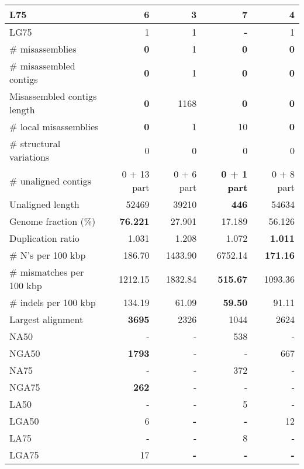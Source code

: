 \documentclass[12pt,a4paper]{article}
\begin{document}
\begin{table}[ht]
\begin{center}
\begin{tabular}{|l*{4}{|r}|}
L75 & 6 & {\bf 3} & 7 & 4 \\ \hline
LG75 & 1 & 1 & {\bf -} & 1 \\ \hline
\# misassemblies & {\bf 0} & 1 & {\bf 0} & {\bf 0} \\ \hline
\# misassembled contigs & {\bf 0} & 1 & {\bf 0} & {\bf 0} \\ \hline
Misassembled contigs length & {\bf 0} & 1168 & {\bf 0} & {\bf 0} \\ \hline
\# local misassemblies & {\bf 0} & 1 & 10 & {\bf 0} \\ \hline
\# structural variations & 0 & 0 & 0 & 0 \\ \hline
\# unaligned contigs & 0 + 13 part & 0 + 6 part & {\bf 0 + 1 part} & 0 + 8 part \\ \hline
Unaligned length & 52469 & 39210 & {\bf 446} & 54634 \\ \hline
Genome fraction (\%) & {\bf 76.221} & 27.901 & 17.189 & 56.126 \\ \hline
Duplication ratio & 1.031 & 1.208 & 1.072 & {\bf 1.011} \\ \hline
\# N's per 100 kbp & 186.70 & 1433.90 & 6752.14 & {\bf 171.16} \\ \hline
\# mismatches per 100 kbp & 1212.15 & 1832.84 & {\bf 515.67} & 1093.36 \\ \hline
\# indels per 100 kbp & 134.19 & 61.09 & {\bf 59.50} & 91.11 \\ \hline
Largest alignment & {\bf 3695} & 2326 & 1044 & 2624 \\ \hline
NA50 & - & - & 538 & - \\ \hline
NGA50 & {\bf 1793} & - & - & 667 \\ \hline
NA75 & - & - & 372 & - \\ \hline
NGA75 & {\bf 262} & - & - & - \\ \hline
LA50 & - & - & 5 & - \\ \hline
LGA50 & 6 & {\bf -} & {\bf -} & 12 \\ \hline
LA75 & - & - & 8 & - \\ \hline
LGA75 & 17 & {\bf -} & {\bf -} & {\bf -} \\ \hline
\end{tabular}
\end{center}
\end{table}
\end{document}

